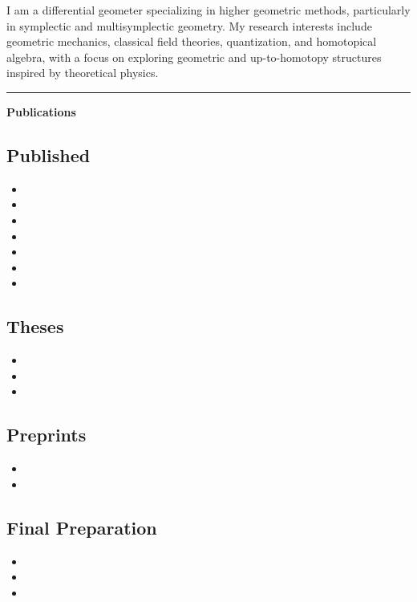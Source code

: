 \documentclass[a4paper]{article}
\newcommand{\block}[1]{\hrule \vspace{0.2cm} \textbf{\Large #1} \vspace{0.2cm}}
\begin{document}
{I am a differential geometer specializing in higher geometric methods, particularly in symplectic and multisymplectic geometry. My research interests include geometric mechanics, classical field theories, quantization, and homotopical algebra, with a focus on exploring geometric and up-to-homotopy structures inspired by theoretical physics.\vspace{0.25em}}
\vspace{1em}
{\block{Publications}\subsection*{Published}
\begin{itemize}
\item {}
\item {}
\item {}
\item {}
\item {}
\item {}
\item {}
\end{itemize}
\subsection*{Theses}
\begin{itemize}
\item {}
\item {}
\item {}
\end{itemize}
\subsection*{Preprints}
\begin{itemize}
\item {}
\item {}
\end{itemize}
\subsection*{Final Preparation}
\begin{itemize}
\item {}
\item {}
\item {}
\end{itemize}
}
\end{document}
